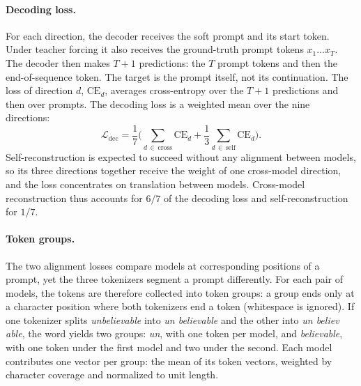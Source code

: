 \paragraph{Decoding loss.} For each direction, the decoder receives the soft prompt and its start token.
Under teacher forcing it also receives the ground-truth prompt tokens $x_1 \ldots x_T$.
The decoder then makes $T+1$ predictions: the $T$ prompt tokens and then the end-of-sequence token.
The target is the prompt itself, not its continuation.
The loss of direction $d$, $\text{CE}_d$, averages cross-entropy over the $T+1$ predictions and then over prompts. %
The decoding loss is a weighted mean over the nine directions:
\begin{equation}
\mathcal{L}_{\text{dec}} = \frac{1}{7}\Big(\sum_{d\,\in\,\text{cross}} \text{CE}_d + \frac{1}{3}\sum_{d\,\in\,\text{self}} \text{CE}_d\Big).
\label{eq:hub:dec}
\end{equation}
Self-reconstruction is expected to succeed without any alignment between models, so its three directions together receive the weight of one cross-model direction, and the loss concentrates on translation between models.
Cross-model reconstruction thus accounts for $6/7$ of the decoding loss and self-reconstruction for $1/7$.

\paragraph{Token groups.} The two alignment losses compare models at corresponding positions of a prompt, yet the three tokenizers segment a prompt differently.
For each pair of models, the tokens are therefore collected into token groups: a group ends only at a character position where both tokenizers end a token (whitespace is ignored). %
If one tokenizer splits \emph{unbelievable} into \emph{un \textbar{} believable} and the other into \emph{un \textbar{} believ \textbar{} able}, the word yields two groups: \emph{un}, with one token per model, and \emph{believable}, with one token under the first model and two under the second.
Each model contributes one vector per group: the mean of its token vectors, weighted by character coverage and normalized to unit length.

